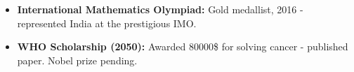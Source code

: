 
\begin{itemize} 
    \item \textbf{International Mathematics Olympiad: } Gold medallist, 2016 - represented India at the prestigious IMO.
    \item \textbf{WHO Scholarship (2050):} Awarded 80000\$ for solving cancer - published paper. Nobel prize pending.
\end{itemize}